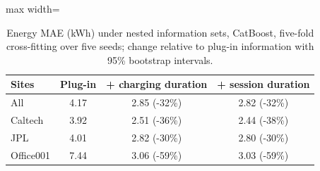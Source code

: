\begin{table}[!tbp]
\centering\footnotesize
\caption{Energy MAE (kWh) under nested information sets, CatBoost, five-fold cross-fitting over five seeds; change relative to plug-in information with 95\% bootstrap intervals.}
\label{tab:availability}
\begin{adjustbox}{max width=\textwidth}
\begin{tabular}{lccc}
\toprule
Sites & Plug-in & + charging duration & + session duration \\
\midrule
All & 4.17 & 2.85 (-32\%) & 2.82 (-32\%) \\
Caltech & 3.92 & 2.51 (-36\%) & 2.44 (-38\%) \\
JPL & 4.01 & 2.82 (-30\%) & 2.80 (-30\%) \\
Office001 & 7.44 & 3.06 (-59\%) & 3.03 (-59\%) \\
\bottomrule
\end{tabular}
\end{adjustbox}
\end{table}
